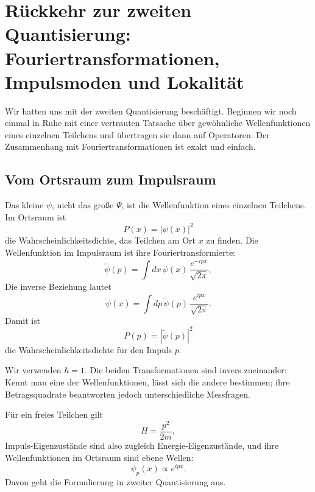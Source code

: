 \section{Rückkehr zur zweiten Quantisierung: Fouriertransformationen, Impulsmoden und Lokalität}

Wir hatten uns mit der zweiten Quantisierung beschäftigt. Beginnen wir noch einmal in Ruhe mit einer vertrauten Tatsache über gewöhnliche Wellenfunktionen eines einzelnen Teilchens und übertragen sie dann auf Operatoren. Der Zusammenhang mit Fouriertransformationen ist exakt und einfach.

\subsection{Vom Ortsraum zum Impulsraum}

Das kleine \(\psi\), nicht das große \(\Psi\), ist die Wellenfunktion eines einzelnen Teilchens. Im Ortsraum ist
\begin{equation}
P(x)=|\psi(x)|^2
\end{equation}
die Wahrscheinlichkeitsdichte, das Teilchen am Ort \(x\) zu finden. Die Wellenfunktion im Impulsraum ist ihre Fouriertransformierte:
\begin{equation}
\tilde{\psi}(p)=\int dx\,\psi(x)\,\frac{e^{-ipx}}{\sqrt{2\pi}},
\end{equation}
Die inverse Beziehung lautet
\begin{equation}
\psi(x)=\int dp\,\tilde{\psi}(p)\,\frac{e^{ipx}}{\sqrt{2\pi}}.
\end{equation}
Damit ist
\begin{equation}
P(p)=|\tilde{\psi}(p)|^2
\end{equation}
die Wahrscheinlichkeitsdichte für den Impuls \(p\).

Wir verwenden \(\hbar=1\). Die beiden Transformationen sind invers zueinander: Kennt man eine der Wellenfunktionen, lässt sich die andere bestimmen; ihre Betragsquadrate beantworten jedoch unterschiedliche Messfragen.

Für ein freies Teilchen gilt
\begin{equation}
H=\frac{p^2}{2m},
\end{equation}
Impuls-Eigenzustände sind also zugleich Energie-Eigenzustände, und ihre Wellenfunktionen im Ortsraum sind ebene Wellen:
\begin{equation}
\psi_p(x)\propto e^{ipx}.
\end{equation}
Davon geht die Formulierung in zweiter Quantisierung aus.


